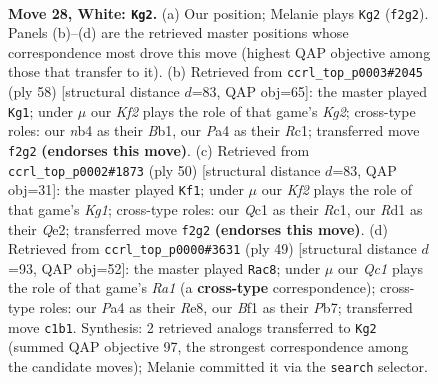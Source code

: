 \documentclass[11pt]{article}
\begin{document}
\clearpage

\begin{figure}[p]\centering
\begin{subfigure}{0.46\textwidth}\centering
\resizebox{\linewidth}{!}{%
\newchessgame
\chessboard[
  setfen={1nb2qr1/rp4k1/2p1p3/p2p1p1p/Pn1P1P1N/2N3P1/1PP2K1P/2QR1B1R w - - 9 28},
  showmover=false,
  pgfstyle=straightmove, color=movearrow, markmove={f2-g2}
]}
\caption{}
\end{subfigure}\hfill
\begin{subfigure}{0.46\textwidth}\centering
\resizebox{\linewidth}{!}{%
\newchessgame
\chessboard[
  setfen={1r2qnk1/2r3pp/npb1p3/p2pPp2/P2P1P2/RNN3P1/1P3QKP/1BR5 w - - 7 30},
  showmover=false,
  pgfstyle=straightmove, color=movearrow, markmove={g2-g1}
]}
\caption{}
\end{subfigure}
\\[4pt]
\begin{subfigure}{0.46\textwidth}\centering
\resizebox{\linewidth}{!}{%
\newchessgame
\chessboard[
  setfen={r2rb1k1/1p2qpp1/4pn1p/3pN2P/1P3P2/pRPB2P1/P3QP2/2R3K1 w - - 3 26},
  showmover=false,
  pgfstyle=straightmove, color=movearrow, markmove={g1-f1}
]}
\caption{}
\end{subfigure}\hfill
\begin{subfigure}{0.46\textwidth}\centering
\resizebox{\linewidth}{!}{%
\newchessgame
\chessboard[
  setfen={r3r1k1/1pp1qppb/3p3p/p1nP1P2/P1PN2P1/R4Q1P/1P6/2B2RK1 b - - 6 25},
  showmover=false,
  pgfstyle=straightmove, color=movearrow, markmove={a8-c8}
]}
\caption{}
\end{subfigure}
\caption{\textbf{Move 28, White: \texttt{Kg2}.} (a) Our position; Melanie plays \texttt{Kg2} (\texttt{f2g2}). Panels (b)--(d) are the retrieved master positions whose correspondence most drove this move (highest QAP objective among those that transfer to it). (b) Retrieved from \texttt{ccrl\_top\_p0003\#2045} (ply 58) [structural distance $d$=83, QAP obj=65]: the master played \texttt{Kg1}; under $\mu$ our \emph{Kf2} plays the role of that game's \emph{Kg2}; cross-type roles: our \emph{n}b4 as their \emph{B}b1, our \emph{P}a4 as their \emph{R}c1; transferred move \texttt{f2g2} \textbf{(endorses this move)}. (c) Retrieved from \texttt{ccrl\_top\_p0002\#1873} (ply 50) [structural distance $d$=83, QAP obj=31]: the master played \texttt{Kf1}; under $\mu$ our \emph{Kf2} plays the role of that game's \emph{Kg1}; cross-type roles: our \emph{Q}c1 as their \emph{R}c1, our \emph{R}d1 as their \emph{Q}e2; transferred move \texttt{f2g2} \textbf{(endorses this move)}. (d) Retrieved from \texttt{ccrl\_top\_p0000\#3631} (ply 49) [structural distance $d$=93, QAP obj=52]: the master played \texttt{Rac8}; under $\mu$ our \emph{Qc1} plays the role of that game's \emph{Ra1} (a \textbf{cross-type} correspondence); cross-type roles: our \emph{P}a4 as their \emph{R}e8, our \emph{B}f1 as their \emph{P}b7; transferred move \texttt{c1b1}. Synthesis: 2 retrieved analogs transferred to \texttt{Kg2} (summed QAP objective 97, the strongest correspondence among the candidate moves); Melanie committed it via the \texttt{search} selector.}
\label{fig:thought-m54}
\end{figure}
\end{document}
